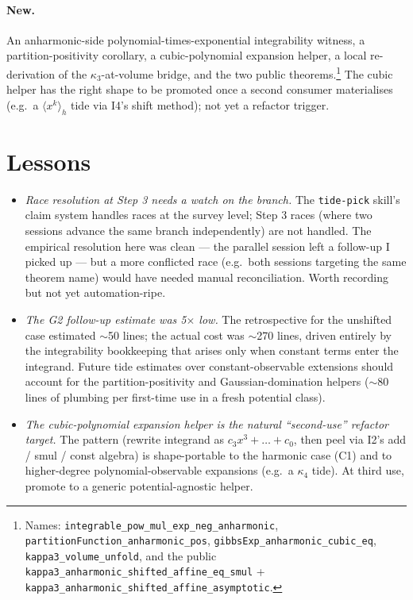 \documentclass[11pt]{article}
\begin{document}
\paragraph{New.} An anharmonic-side polynomial-times-exponential
integrability witness, a partition-positivity corollary, a
cubic-polynomial expansion helper, a local re-derivation of the
$\kappa_3$-at-volume bridge, and the two public
theorems.\footnote{Names:
\texttt{integrable\_pow\_mul\_exp\_neg\_anharmonic},
\texttt{partitionFunction\_anharmonic\_pos},
\texttt{gibbsExp\_anharmonic\_cubic\_eq},
\texttt{kappa3\_volume\_unfold}, and the public
\texttt{kappa3\_anharmonic\_shifted\_affine\_eq\_smul} +
\texttt{kappa3\_anharmonic\_shifted\_affine\_asymptotic}.}
The cubic helper has the right shape to be promoted once a second
consumer materialises (e.g.\ a $\langle x^k \rangle_h$ tide via
I4's shift method); not yet a refactor trigger.

\section{Lessons}

\begin{itemize}
\item \emph{Race resolution at Step 3 needs a watch on the branch.}
  The \texttt{tide-pick} skill's claim system handles races at the
  survey level; Step 3 races (where two sessions advance the same
  branch independently) are not handled. The empirical resolution
  here was clean — the parallel session left a follow-up I picked up
  — but a more conflicted race (e.g.\ both sessions targeting the
  same theorem name) would have needed manual reconciliation. Worth
  recording but not yet automation-ripe.
\item \emph{The G2 follow-up estimate was 5$\times$ low.} The
  retrospective for the unshifted case estimated $\sim$50 lines; the
  actual cost was $\sim$270 lines, driven entirely by the
  integrability bookkeeping that arises only when constant terms
  enter the integrand. Future tide estimates over constant-observable
  extensions should account for the partition-positivity and
  Gaussian-domination helpers ($\sim$80 lines of plumbing per
  first-time use in a fresh potential class).
\item \emph{The cubic-polynomial expansion helper is the natural
  ``second-use'' refactor target.} The pattern (rewrite integrand
  as $c_3 x^3 + \dots + c_0$, then peel via I2's add / smul / const
  algebra) is shape-portable to the harmonic case (C1) and to
  higher-degree polynomial-observable expansions (e.g.\ a $\kappa_4$
  tide). At third use, promote to a generic potential-agnostic
  helper.
\end{itemize}
\end{document}
